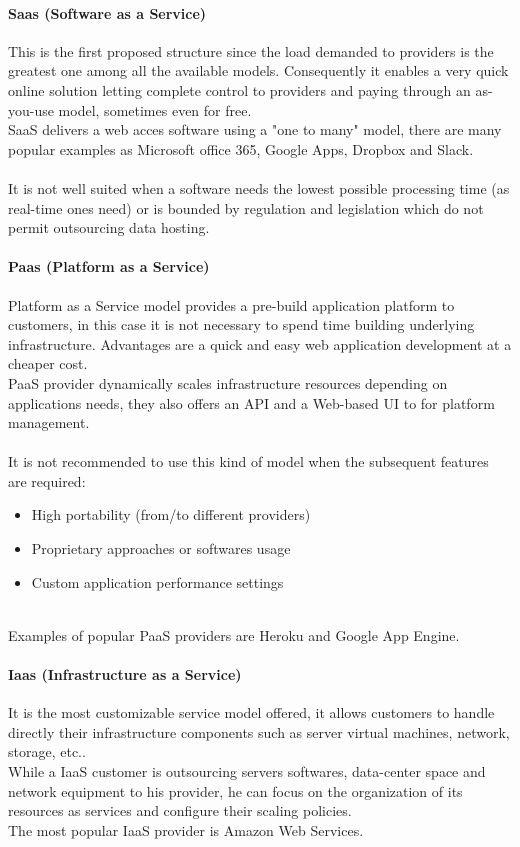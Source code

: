 \paragraph{Saas (Software as a Service)}
\label{paragraph:Saas}
This is the first proposed structure since the load demanded to providers is the greatest one among all the available models.
Consequently it enables a very quick online solution letting complete control to providers and paying through an as-you-use model, sometimes even for free.\\
SaaS delivers a web acces software using a "one to many" model, there are many popular examples as Microsoft office 365, Google Apps, Dropbox and Slack. \cite{saas_examples}\\ \\
It is not well suited when a software needs the lowest possible processing time (as real-time ones need) or is bounded by regulation and legislation which do not permit outsourcing data hosting.
\paragraph{Paas (Platform as a Service)}
\label{paragraph:Paas}
Platform as a Service model provides a pre-build application platform to customers, in this case it is not necessary to spend time building underlying infrastructure. Advantages are a quick and easy web application development at a cheaper cost.\\
PaaS provider dynamically scales infrastructure resources depending on applications needs, they also offers an API and a Web-based UI to for platform management.\\ \\
It is not recommended to use this kind of model when the subsequent features are required:
\begin{itemize}
    \item High portability (from/to different providers)
    \item Proprietary approaches or softwares usage
    \item Custom application performance settings 
\end{itemize}
\cite{CloudComputingModels}\cite{cloud_computing_stack_saas_paas_iaas}\\
Examples of popular PaaS providers are Heroku and Google App Engine.
\paragraph{Iaas (Infrastructure as a Service)}
\label{paragraph:Iaas}
It is the most customizable service model offered, it allows customers to handle directly their infrastructure components such as server virtual machines, network, storage, etc..\\
While a IaaS customer is outsourcing servers softwares, data-center space and network equipment to his provider, he can focus on the organization of its resources as services and configure their scaling policies.\\
The most popular IaaS provider is Amazon Web Services.
